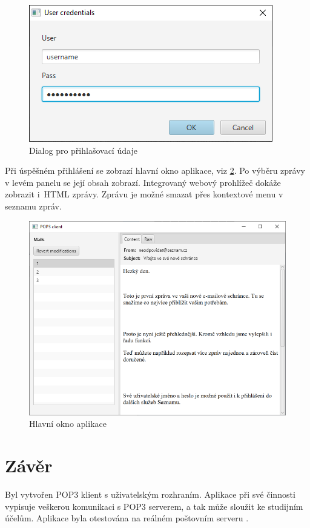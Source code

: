 \documentclass[12pt, a4paper]{article}
\begin{document}
\begin{figure}[H]
	\centering
	\includegraphics[width=0.65\linewidth]{gui-2}
	\caption{Dialog pro přihlašovací údaje}
	\label{fig:gui-2}
\end{figure}

\noindent
Při úspěšném přihlášení se zobrazí hlavní okno aplikace, viz \ref{fig:gui-3}.
Po výběru zprávy v levém panelu se její obsah zobrazí.
Integrovaný webový prohlížeč dokáže zobrazit i~HTML zprávy.
Zprávu je možné smazat přes kontextové menu v seznamu zpráv.

\begin{figure}[H]
	\centering
	\includegraphics[width=1\linewidth]{gui-3}
	\caption{Hlavní okno aplikace}
	\label{fig:gui-3}
\end{figure}


\section*{Závěr}
Byl vytvořen POP3 klient s uživatelským rozhraním.
Aplikace při své činnosti vypisuje veškerou komunikaci s POP3 serverem, a tak může sloužit ke studijním účelům.
Aplikace byla otestována na reálném poštovním serveru .


% 
% 

% 
\end{document}
